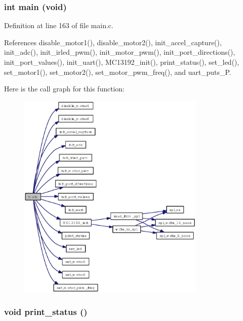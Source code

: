 \subsubsection{\setlength{\rightskip}{0pt plus 5cm}int main (void)}\label{main_8c_840291bc02cba5474a4cb46a9b9566fe}




Definition at line 163 of file main.c.

References disable\_\-motor1(), disable\_\-motor2(), init\_\-accel\_\-capture(), init\_\-adc(), init\_\-irled\_\-pwm(), init\_\-motor\_\-pwm(), init\_\-port\_\-directions(), init\_\-port\_\-values(), init\_\-uart(), MC13192\_\-init(), print\_\-status(), set\_\-led(), set\_\-motor1(), set\_\-motor2(), set\_\-motor\_\-pwm\_\-freq(), and uart\_\-puts\_\-P.

Here is the call graph for this function:\begin{figure}[H]
\begin{center}
\leavevmode
\includegraphics[width=256pt]{main_8c_840291bc02cba5474a4cb46a9b9566fe_cgraph}
\end{center}
\end{figure}
\subsubsection{\setlength{\rightskip}{0pt plus 5cm}void print\_\-status ()}\label{main_8c_8008fbbb8f369eeb0f452863fe664355}




